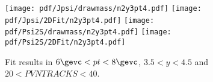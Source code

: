\begin{figure}[H]
\begin{center}
\texttt{[image: pdf/Jpsi/drawmass/n2y3pt4.pdf]}
\texttt{[image: pdf/Jpsi/2DFit/n2y3pt4.pdf]}
\vspace*{-0.5cm}
\texttt{[image: pdf/Psi2S/drawmass/n2y3pt4.pdf]}
\texttt{[image: pdf/Psi2S/2DFit/n2y3pt4.pdf]}
\vspace*{-0.5cm}
\end{center}
\caption{Fit results in $6\gevc<pt<8\gevc$, $3.5<y<4.5$ and $20<PVNTRACKS<40$.}
\label{Fitn2y3pt4}
\end{figure}
